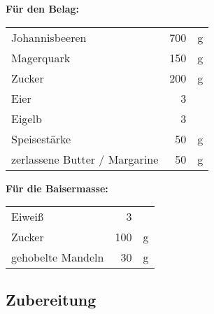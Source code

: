 \textbf{Für den Belag:\\}
\begin{tabular}{lrl}
    Johannisbeeren                & 700 & g \\
    Magerquark                    & 150 & g \\
    Zucker                        & 200 & g \\
    Eier                          &   3 &   \\
    Eigelb                        &   3 &   \\
    Speisestärke                  &  50 & g \\
    zerlassene Butter / Margarine &  50 & g
\end{tabular} 

\textbf{Für die Baisermasse:\\}
\begin{tabular}{lrl}
    Eiweiß            &   3 &   \\
    Zucker            & 100 & g \\
    gehobelte Mandeln &  30 & g
\end{tabular} 


\subsection*{Zubereitung}

